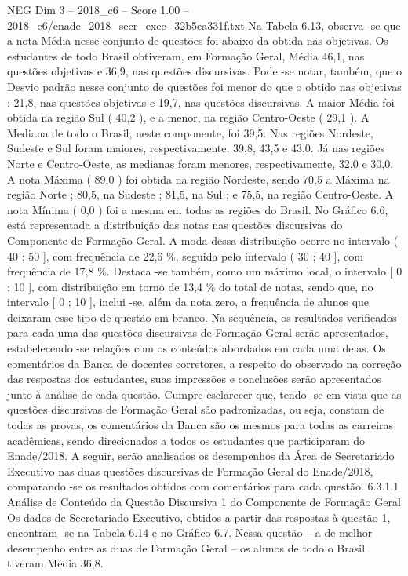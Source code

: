 \begin{textsample}{NEG Dim 3 – 2018\_c6 – Score 1.00 – 2018\_c6/enade\_2018\_secr\_exec\_32b5ea331f.txt}
Na Tabela 6.13, observa -se que a nota Média nesse conjunto de questões foi abaixo da obtida nas objetivas.
Os estudantes de todo Brasil obtiveram, em Formação Geral, Média 46,1, nas questões objetivas e 36,9, nas questões discursivas.
Pode -se notar, também, que o Desvio padrão nesse conjunto de questões foi menor do que o obtido nas objetivas : 21,8, nas questões objetivas e 19,7, nas questões discursivas.
A maior Média foi obtida na região Sul ( 40,2 ), e a menor, na região Centro-Oeste ( 29,1 ).
A Mediana de todo o Brasil, neste componente, foi 39,5.
Nas regiões Nordeste, Sudeste e Sul foram maiores, respectivamente, 39,8, 43,5 e 43,0.
Já nas regiões Norte e Centro-Oeste, as medianas foram menores, respectivamente, 32,0 e 30,0.
A nota Máxima ( 89,0 ) foi obtida na região Nordeste, sendo 70,5 a Máxima na região Norte ; 80,5, na Sudeste ; 81,5, na Sul ; e 75,5, na região Centro-Oeste.
A nota Mínima ( 0,0 ) foi a mesma em todas as regiões do Brasil.
No Gráfico 6.6, está representada a distribuição das notas nas questões discursivas do Componente de Formação Geral.
A moda dessa distribuição ocorre no intervalo ( 40 ; 50 ], com frequência de 22,6 \%, seguida pelo intervalo ( 30 ; 40 ], com frequência de 17,8 \%.
Destaca -se também, como um máximo local, o intervalo [ 0 ; 10 ], com distribuição em torno de 13,4 \% do total de notas, sendo que, no intervalo [ 0 ; 10 ], inclui -se, além da nota zero, a frequência de alunos que deixaram esse tipo de questão em branco.
Na sequência, os resultados verificados para cada uma das questões discursivas de Formação Geral serão apresentados, estabelecendo -se relações com os conteúdos abordados em cada uma delas.
Os comentários da Banca de docentes corretores, a respeito do observado na correção das respostas dos estudantes, suas impressões e conclusões serão apresentados junto à análise de cada questão.
Cumpre esclarecer que, tendo -se em vista que as questões discursivas de Formação Geral são padronizadas, ou seja, constam de todas as provas, os comentários da Banca são os mesmos para todas as carreiras acadêmicas, sendo direcionados a todos os estudantes que participaram do Enade/2018.
A seguir, serão analisados os desempenhos da Área de Secretariado Executivo nas duas questões discursivas de Formação Geral do Enade/2018, comparando -se os resultados obtidos com comentários para cada questão. 6.3.1.1 Análise de Conteúdo da Questão Discursiva 1 do Componente de Formação Geral Os dados de Secretariado Executivo, obtidos a partir das respostas à questão 1, encontram -se na Tabela 6.14 e no Gráfico 6.7.
Nessa questão – a de melhor desempenho entre as duas de Formação Geral – os alunos de todo o Brasil tiveram Média 36,8.

\end{textsample}
